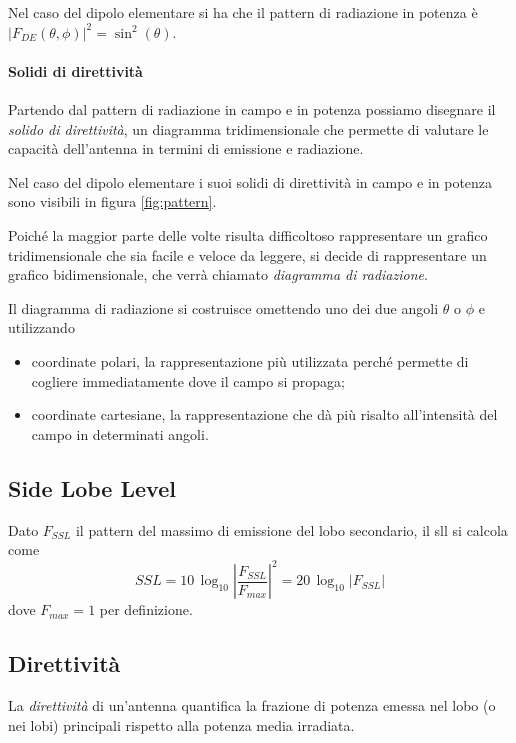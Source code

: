 Nel caso del dipolo elementare si ha che il pattern di radiazione in potenza è
$|F_{DE}(\theta,\phi)|^2 = \sin^2(\theta)$.

\paragraph{Solidi di direttività}
Partendo dal pattern di radiazione in campo e in potenza possiamo disegnare il \emph{solido di direttività}, un diagramma tridimensionale che permette di valutare le capacità dell'antenna in termini di emissione e radiazione.

Nel caso del dipolo elementare i suoi solidi di direttività in campo e in potenza sono visibili in figura \ref{fig:pattern}.

Poiché la maggior parte delle volte risulta difficoltoso rappresentare un grafico tridimensionale che sia facile e veloce da leggere, si decide di rappresentare un grafico bidimensionale, che verrà chiamato \emph{diagramma di radiazione}.

Il diagramma di radiazione si costruisce omettendo uno dei due angoli $\theta$ o $\phi$ e utilizzando
\begin{itemize}
	\item coordinate polari, la rappresentazione più utilizzata perché permette di cogliere immediatamente dove il campo si propaga;
	\item coordinate cartesiane, la rappresentazione che dà più risalto all'intensità del campo in determinati angoli.
\end{itemize}

\subsection{Side Lobe Level}
Dato $F_{SSL}$ il pattern del massimo di emissione del lobo secondario, il \gls{sll} si calcola come
\begin{equation}\label{eq:SLL}
	SSL=10 \, \log_{10}\left|\frac{F_{SSL}}{F_{max}}\right|^2 = 20 \, \log_{10} |F_{SSL}|
\end{equation}
dove $F_{max}=1$ per definizione.

\subsection{Direttività}
La \emph{direttività} di un'antenna quantifica la frazione di potenza emessa nel lobo (o nei lobi) principali rispetto alla potenza media irradiata.


